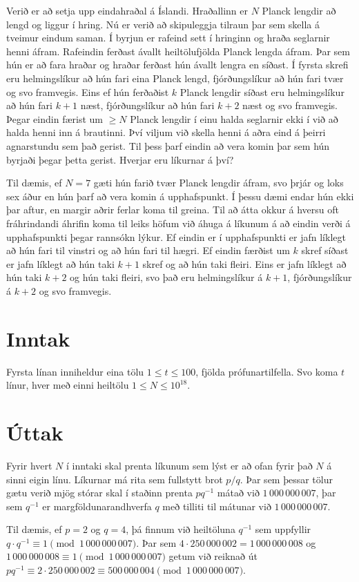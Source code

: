 
Verið er að setja upp eindahraðal á Íslandi.
Hraðallinn er $N$ Planck lengdir að lengd og liggur í hring.
Nú er verið að skipuleggja tilraun þar sem skella á tveimur eindum saman.
Í byrjun er rafeind sett í hringinn og hraða seglarnir henni áfram.
Rafeindin ferðast ávallt heiltölufjölda Planck lengda áfram.
Þar sem hún er að fara hraðar og hraðar ferðast hún ávallt lengra en síðast.
Í fyrsta skrefi eru helmingslíkur að hún fari eina Planck lengd, fjórðungslíkur að hún fari tvær og svo framvegis.
Eins ef hún ferðaðist $k$ Planck lengdir síðast eru helmingslíkur að hún fari $k + 1$ næst,
fjórðungslíkur að hún fari $k + 2$ næst og svo framvegis.
Þegar eindin færist um $\geq N$ Planck lengdir í einu halda seglarnir ekki í við að halda henni inn á brautinni.
Því viljum við skella henni á aðra eind á þeirri agnarstundu sem það gerist.
Til þess þarf eindin að vera komin þar sem hún byrjaði þegar þetta gerist.
Hverjar eru líkurnar á því?

Til dæmis, ef $N = 7$ gæti hún farið tvær Planck lengdir áfram, svo þrjár og loks sex áður en hún þarf að vera komin á upphafspunkt.
Í þessu dæmi endar hún ekki þar aftur, en margir aðrir ferlar koma til greina.
Til að átta okkur á hversu oft fráhrindandi áhrifin koma til leiks höfum við áhuga á líkunum á að eindin verði á upphafspunkti þegar rannsókn lýkur.
Ef eindin er í upphafspunkti er jafn líklegt að hún fari til vinstri og að hún fari til hægri.
Ef eindin færðist um $k$ skref síðast er jafn líklegt að hún taki $k + 1$ skref og að hún taki fleiri.
Eins er jafn líklegt að hún taki $k + 2$ og hún taki fleiri, svo það eru helmingslíkur á $k + 1$, fjórðungslíkur á $k + 2$ og svo framvegis.

\section*{Inntak}
Fyrsta línan inniheldur eina tölu $1 \leq t \leq 100$, fjölda prófunartilfella.
Svo koma $t$ línur, hver með einni heiltölu $1 \leq N \leq 10^{18}$.

\section*{Úttak}
Fyrir hvert $N$ í inntaki skal prenta líkunum sem lýst er að ofan fyrir það $N$ á sinni eigin línu.
Líkurnar má rita sem fullstytt brot $p/q$.
Þar sem þessar tölur gætu verið mjög stórar skal í staðinn prenta $pq^{-1}$ mátað við $1\,000\,000\,007$,
þar sem $q^{-1}$ er margföldunarandhverfa $q$ með tilliti til mátunar við $1\,000\,000\,007$.

Til dæmis, ef $p=2$ og $q=4$, þá finnum við heiltöluna $q^{-1}$ sem uppfyllir $q \cdot q^{-1} \equiv 1 \pmod{1\,000\,000\,007}$.
Þar sem $4 \cdot 250\,000\,002 = 1\,000\,000\,008$ og $1\,000\,000\,008 \equiv 1 \pmod{1\,000\,000\,007}$ getum við reiknað út
$pq^{-1} \equiv 2 \cdot 250\,000\,002 \equiv 500\,000\,004 \pmod{1\,000\,000\,007}$.
